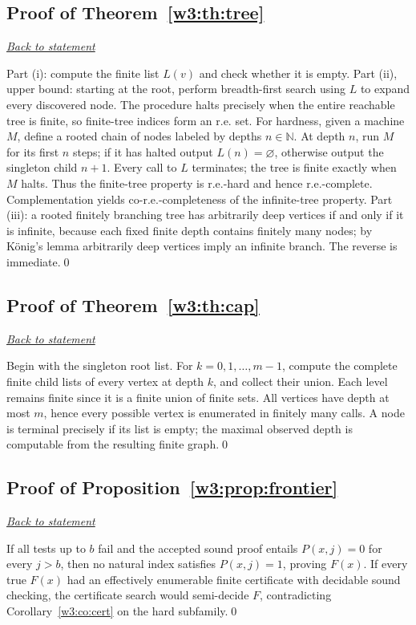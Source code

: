 \documentclass[11pt,letterpaper]{article}
\theoremstyle{definition}\newtheorem{definition}[theorem]{Definition}\newtheorem{example}[theorem]{Example}
\theoremstyle{remark}\newtheorem{remark}[theorem]{Remark}
\newcommand{\backlink}[1]{\noindent\hyperref[#1]{\textit{Back to statement}}\par\smallskip}
\begin{document}
\subsection{Proof of Theorem~\ref{w3:th:tree}}\label{w3:pr:tree}\backlink{w3:th:tree}
Part (i): compute the finite list $L(v)$ and check whether it is empty. Part (ii), upper bound: starting at the root, perform breadth-first search using $L$ to expand every discovered node. The procedure halts precisely when the entire reachable tree is finite, so finite-tree indices form an r.e. set. For hardness, given a machine $M$, define a rooted chain of nodes labeled by depths $n\in\mathbb N$. At depth $n$, run $M$ for its first $n$ steps; if it has halted output $L(n)=\varnothing$, otherwise output the singleton child $n+1$. Every call to $L$ terminates; the tree is finite exactly when $M$ halts. Thus the finite-tree property is r.e.-hard and hence r.e.-complete. Complementation yields co-r.e.-completeness of the infinite-tree property. Part (iii): a rooted finitely branching tree has arbitrarily deep vertices if and only if it is infinite, because each fixed finite depth contains finitely many nodes; by K\"onig's lemma arbitrarily deep vertices imply an infinite branch. The reverse is immediate.\qed


\subsection{Proof of Theorem~\ref{w3:th:cap}}\label{w3:pr:cap}\backlink{w3:th:cap}
Begin with the singleton root list. For $k=0,1,\dots,m-1$, compute the complete finite child lists of every vertex at depth $k$, and collect their union. Each level remains finite since it is a finite union of finite sets. All vertices have depth at most $m$, hence every possible vertex is enumerated in finitely many calls. A node is terminal precisely if its list is empty; the maximal observed depth is computable from the resulting finite graph.\qed


\subsection{Proof of Proposition~\ref{w3:prop:frontier}}\label{w3:pr:frontier}\backlink{w3:prop:frontier}
If all tests up to $b$ fail and the accepted sound proof entails $P(x,j)=0$ for every $j>b$, then no natural index satisfies $P(x,j)=1$, proving $F(x)$. If every true $F(x)$ had an effectively enumerable finite certificate with decidable sound checking, the certificate search would semi-decide $F$, contradicting Corollary~\ref{w3:co:cert} on the hard subfamily.\qed
\end{document}
